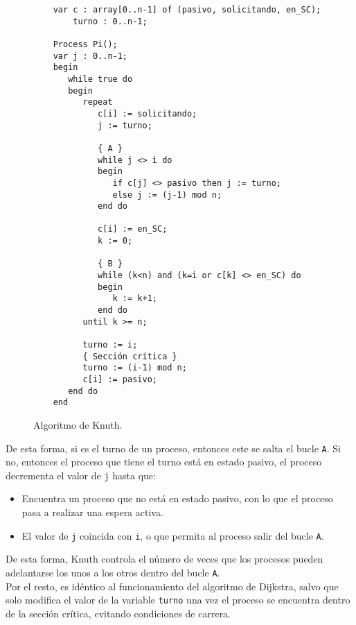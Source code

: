 \begin{figure}[H]
\begin{verbatim}
    var c : array[0..n-1] of (pasivo, solicitando, en_SC);
        turno : 0..n-1;

    Process Pi();
    var j : 0..n-1;
    begin
       while true do
       begin
          repeat
             c[i] := solicitando;
             j := turno;

             { A }
             while j <> i do
             begin
                if c[j] <> pasivo then j := turno;
                else j := (j-1) mod n;
             end do

             c[i] := en_SC;
             k := 0;

             { B }
             while (k<n) and (k=i or c[k] <> en_SC) do
             begin
                k := k+1;
             end do
          until k >= n;

          turno := i;
          { Sección crítica }
          turno := (i-1) mod n;
          c[i] := pasivo;
       end do
    end
\end{verbatim}
\caption{Algoritmo de Knuth.}
\end{figure}
De esta forma, si es el turno de un proceso, entonces este se salta el bucle \verb|A|. Si no, entonces el proceso que tiene el turno está en estado pasivo, el proceso decrementa el valor de \verb|j| hasta que:
\begin{itemize}
    \item Encuentra un proceso que no está en estado pasivo, con lo que el proceso pasa a realizar una espera activa.
    \item El valor de \verb|j| coincida con \verb|i|, o que permita al proceso salir del bucle \verb|A|.
\end{itemize}
De esta forma, Knuth controla el número de veces que los procesos pueden adelantarse los unos a los otros dentro del bucle \verb|A|.\\

Por el resto, es idéntico al funcionamiento del algoritmo de Dijkstra, salvo que solo modifica el valor de la variable \verb|turno| una vez el proceso se encuentra dentro de la sección crítica, evitando condiciones de carrera.


